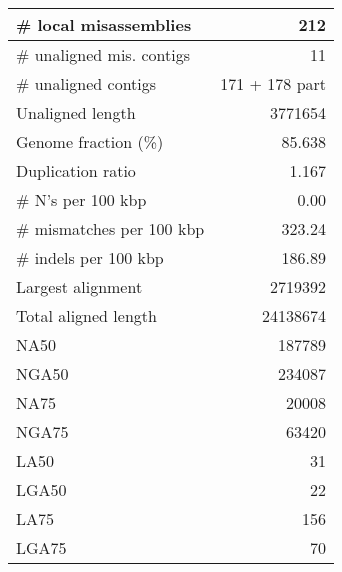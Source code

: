 \documentclass[12pt,a4paper]{article}
\begin{document}
\begin{table}[ht]
\begin{center}
\begin{tabular}{|l*{1}{|r}|}
\# local misassemblies & 212 \\ \hline
\# unaligned mis. contigs & 11 \\ \hline
\# unaligned contigs & 171 + 178 part \\ \hline
Unaligned length & 3771654 \\ \hline
Genome fraction (\%) & 85.638 \\ \hline
Duplication ratio & 1.167 \\ \hline
\# N's per 100 kbp & 0.00 \\ \hline
\# mismatches per 100 kbp & 323.24 \\ \hline
\# indels per 100 kbp & 186.89 \\ \hline
Largest alignment & 2719392 \\ \hline
Total aligned length & 24138674 \\ \hline
NA50 & 187789 \\ \hline
NGA50 & 234087 \\ \hline
NA75 & 20008 \\ \hline
NGA75 & 63420 \\ \hline
LA50 & 31 \\ \hline
LGA50 & 22 \\ \hline
LA75 & 156 \\ \hline
LGA75 & 70 \\ \hline
\end{tabular}
\end{center}
\end{table}
\end{document}
